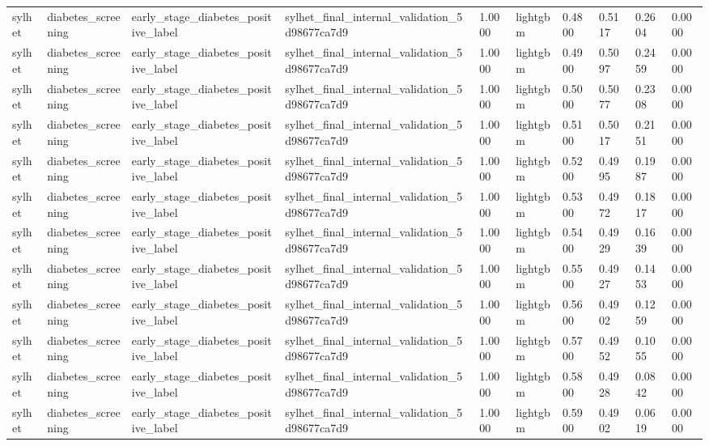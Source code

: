 \begin{tabular}{llllllllll}
sylhet & diabetes\_screening & early\_stage\_diabetes\_positive\_label & sylhet\_final\_internal\_validation\_5d98677ca7d9 & 1.0000 & lightgbm & 0.4800 & 0.5117 & 0.2604 & 0.0000 \\
sylhet & diabetes\_screening & early\_stage\_diabetes\_positive\_label & sylhet\_final\_internal\_validation\_5d98677ca7d9 & 1.0000 & lightgbm & 0.4900 & 0.5097 & 0.2459 & 0.0000 \\
sylhet & diabetes\_screening & early\_stage\_diabetes\_positive\_label & sylhet\_final\_internal\_validation\_5d98677ca7d9 & 1.0000 & lightgbm & 0.5000 & 0.5077 & 0.2308 & 0.0000 \\
sylhet & diabetes\_screening & early\_stage\_diabetes\_positive\_label & sylhet\_final\_internal\_validation\_5d98677ca7d9 & 1.0000 & lightgbm & 0.5100 & 0.5017 & 0.2151 & 0.0000 \\
sylhet & diabetes\_screening & early\_stage\_diabetes\_positive\_label & sylhet\_final\_internal\_validation\_5d98677ca7d9 & 1.0000 & lightgbm & 0.5200 & 0.4995 & 0.1987 & 0.0000 \\
sylhet & diabetes\_screening & early\_stage\_diabetes\_positive\_label & sylhet\_final\_internal\_validation\_5d98677ca7d9 & 1.0000 & lightgbm & 0.5300 & 0.4972 & 0.1817 & 0.0000 \\
sylhet & diabetes\_screening & early\_stage\_diabetes\_positive\_label & sylhet\_final\_internal\_validation\_5d98677ca7d9 & 1.0000 & lightgbm & 0.5400 & 0.4929 & 0.1639 & 0.0000 \\
sylhet & diabetes\_screening & early\_stage\_diabetes\_positive\_label & sylhet\_final\_internal\_validation\_5d98677ca7d9 & 1.0000 & lightgbm & 0.5500 & 0.4927 & 0.1453 & 0.0000 \\
sylhet & diabetes\_screening & early\_stage\_diabetes\_positive\_label & sylhet\_final\_internal\_validation\_5d98677ca7d9 & 1.0000 & lightgbm & 0.5600 & 0.4902 & 0.1259 & 0.0000 \\
sylhet & diabetes\_screening & early\_stage\_diabetes\_positive\_label & sylhet\_final\_internal\_validation\_5d98677ca7d9 & 1.0000 & lightgbm & 0.5700 & 0.4952 & 0.1055 & 0.0000 \\
sylhet & diabetes\_screening & early\_stage\_diabetes\_positive\_label & sylhet\_final\_internal\_validation\_5d98677ca7d9 & 1.0000 & lightgbm & 0.5800 & 0.4928 & 0.0842 & 0.0000 \\
sylhet & diabetes\_screening & early\_stage\_diabetes\_positive\_label & sylhet\_final\_internal\_validation\_5d98677ca7d9 & 1.0000 & lightgbm & 0.5900 & 0.4902 & 0.0619 & 0.0000 \\

\end{tabular}
